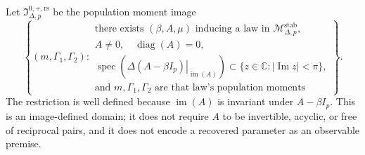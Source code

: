 Let \(\mathfrak I_{\Delta,p}^{0,+,\mathrm{rs}}\) be the population moment image
\[
 \left\{(m,\Gamma_1,\Gamma_2):\begin{array}{l}
 \text{there exists }(\beta,A,\mu)\text{ inducing a law in }\mathcal M_{\Delta,p}^{\mathrm{stab}},\\
 A\neq0,\quad \operatorname{diag}(A)=0,\\
 \operatorname{spec}\!\left(\left.\Delta(A-\beta I_p)\right|_{\operatorname{im}(A)}\right)
 \subset\{z\in\mathbb C:|\operatorname{Im}z|<\pi\},\\
 \text{and }m,\Gamma_1,\Gamma_2\text{ are that law's population moments}
 \end{array}\right\}.
\]
The restriction is well defined because \(\operatorname{im}(A)\) is invariant under \(A-\beta I_p\).  This is an image-defined domain; it does not require \(A\) to be invertible, acyclic, or free of reciprocal pairs, and it does not encode a recovered parameter as an observable premise.